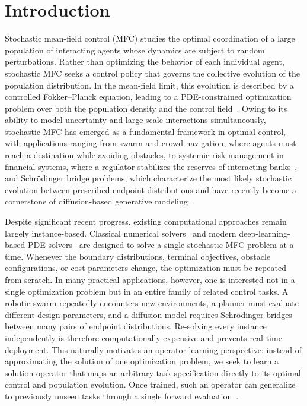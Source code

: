 \documentclass[preprint]{elsarticle}
\begin{document}
\section{Introduction}\label{sec:intro}
Stochastic mean-field control (MFC) studies the optimal coordination of a large population of interacting agents whose dynamics are subject to random perturbations. Rather than optimizing the behavior of each individual agent, stochastic MFC seeks a control policy that governs the collective evolution of the population distribution. In the mean-field limit, this evolution is described by a controlled Fokker--Planck equation, leading to a PDE-constrained optimization problem over both the population density and the control field~\cite{lasry2007mfg,huang2006large,carmona2018probabilistic}. Owing to its ability to model uncertainty and large-scale interactions simultaneously, stochastic MFC has emerged as a fundamental framework in optimal control, with applications ranging from swarm and crowd navigation, where agents must reach a destination while avoiding obstacles, to systemic-risk management in financial systems, where a regulator stabilizes the reserves of interacting banks~\cite{carmona2015systemic}, and Schr\"odinger bridge problems, which characterize the most likely stochastic evolution between prescribed endpoint distributions and have recently become a cornerstone of diffusion-based generative modeling~\cite{chen2016relation,chen2021liaisons,song2021score,debortoli2021dsb}.

Despite significant recent progress, existing computational approaches remain largely instance-based. Classical numerical solvers~\cite{Benamou2000ACF,Benamou2015,yu2024fast,Beck2008FISTA} and modern deep-learning-based PDE solvers~\cite{raissi2019pinn,sirignano2018dgm,weinan2018deepritz,han2018solving,ruthotto2020machine,lin2021apacnet,zhou2025deep,zhou2026simulating,zhao2025variational} are designed to solve a single stochastic MFC problem at a time. Whenever the boundary distributions, terminal objectives, obstacle configurations, or cost parameters change, the optimization must be repeated from scratch. In many practical applications, however, one is interested not in a single optimization problem but in an entire family of related control tasks. A robotic swarm repeatedly encounters new environments, a planner must evaluate different design parameters, and a diffusion model requires Schr\"odinger bridges between many pairs of endpoint distributions. Re-solving every instance independently is therefore computationally expensive and prevents real-time deployment. This naturally motivates an operator-learning perspective: instead of approximating the solution of one optimization problem, we seek to learn a solution operator that maps an arbitrary task specification directly to its optimal control and population evolution. Once trained, such an operator can generalize to previously unseen tasks through a single forward evaluation~\cite{lu2021deeponet,li2021fno}.
\end{document}
